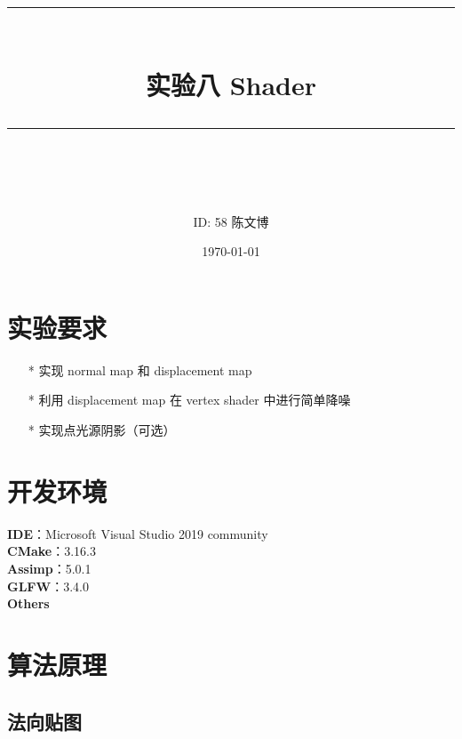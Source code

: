\documentclass[14pt]{scrartcl} %
\title{	
	\normalfont\normalsize
	\rule{\linewidth}{0.5pt}\\ %
	\vspace{20pt} %
	{\huge 实验八	Shader}\\ %
	\vspace{12pt} %
	\rule{\linewidth}{2pt}\\ %
	\vspace{12pt} %
}
\author{\LARGE ID: 58		陈文博} %
\date{\normalsize\today} %
\begin{document}
\maketitle %


\section{实验要求}


\begin{itemize}
	\item[*] 实现 normal map 和 displacement map
	\item[*] 利用 displacement map 在 vertex shader 中进行简单降噪
	\item[*] 实现点光源阴影（可选）
\end{itemize}


\section{开发环境}

\textbf{IDE}：Microsoft Visual Studio 2019 community\\
\textbf{CMake}：3.16.3\\
\textbf{Assimp}：5.0.1\\
\textbf{GLFW}：3.4.0\\
\textbf{Others}

\pagebreak
\section{算法原理}

\subsection{法向贴图}
\end{document}
